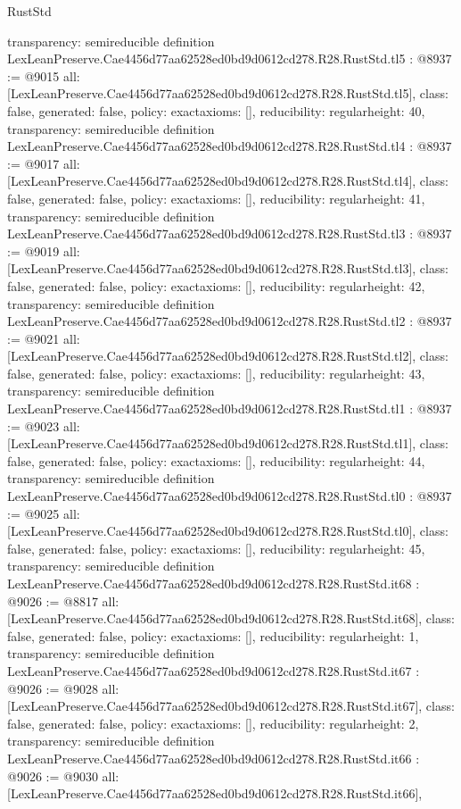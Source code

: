 \begin{lexlean}{RustStd}
\begin{coremodule}
{  transparency: semireducible
}
definition LexLeanPreserve.Cae4456d77aa62528ed0bd9d0612cd278.R28.RustStd.tl5 : @8937 := @9015 {
  all: [LexLeanPreserve.Cae4456d77aa62528ed0bd9d0612cd278.R28.RustStd.tl5],
  class: false,
  generated: false,
  policy: exact{axioms: []},
  reducibility: regular{height: 40},
  transparency: semireducible
}
definition LexLeanPreserve.Cae4456d77aa62528ed0bd9d0612cd278.R28.RustStd.tl4 : @8937 := @9017 {
  all: [LexLeanPreserve.Cae4456d77aa62528ed0bd9d0612cd278.R28.RustStd.tl4],
  class: false,
  generated: false,
  policy: exact{axioms: []},
  reducibility: regular{height: 41},
  transparency: semireducible
}
definition LexLeanPreserve.Cae4456d77aa62528ed0bd9d0612cd278.R28.RustStd.tl3 : @8937 := @9019 {
  all: [LexLeanPreserve.Cae4456d77aa62528ed0bd9d0612cd278.R28.RustStd.tl3],
  class: false,
  generated: false,
  policy: exact{axioms: []},
  reducibility: regular{height: 42},
  transparency: semireducible
}
definition LexLeanPreserve.Cae4456d77aa62528ed0bd9d0612cd278.R28.RustStd.tl2 : @8937 := @9021 {
  all: [LexLeanPreserve.Cae4456d77aa62528ed0bd9d0612cd278.R28.RustStd.tl2],
  class: false,
  generated: false,
  policy: exact{axioms: []},
  reducibility: regular{height: 43},
  transparency: semireducible
}
definition LexLeanPreserve.Cae4456d77aa62528ed0bd9d0612cd278.R28.RustStd.tl1 : @8937 := @9023 {
  all: [LexLeanPreserve.Cae4456d77aa62528ed0bd9d0612cd278.R28.RustStd.tl1],
  class: false,
  generated: false,
  policy: exact{axioms: []},
  reducibility: regular{height: 44},
  transparency: semireducible
}
definition LexLeanPreserve.Cae4456d77aa62528ed0bd9d0612cd278.R28.RustStd.tl0 : @8937 := @9025 {
  all: [LexLeanPreserve.Cae4456d77aa62528ed0bd9d0612cd278.R28.RustStd.tl0],
  class: false,
  generated: false,
  policy: exact{axioms: []},
  reducibility: regular{height: 45},
  transparency: semireducible
}
definition LexLeanPreserve.Cae4456d77aa62528ed0bd9d0612cd278.R28.RustStd.it68 : @9026 := @8817 {
  all: [LexLeanPreserve.Cae4456d77aa62528ed0bd9d0612cd278.R28.RustStd.it68],
  class: false,
  generated: false,
  policy: exact{axioms: []},
  reducibility: regular{height: 1},
  transparency: semireducible
}
definition LexLeanPreserve.Cae4456d77aa62528ed0bd9d0612cd278.R28.RustStd.it67 : @9026 := @9028 {
  all: [LexLeanPreserve.Cae4456d77aa62528ed0bd9d0612cd278.R28.RustStd.it67],
  class: false,
  generated: false,
  policy: exact{axioms: []},
  reducibility: regular{height: 2},
  transparency: semireducible
}
definition LexLeanPreserve.Cae4456d77aa62528ed0bd9d0612cd278.R28.RustStd.it66 : @9026 := @9030 {
  all: [LexLeanPreserve.Cae4456d77aa62528ed0bd9d0612cd278.R28.RustStd.it66],
}
\end{coremodule}
\end{lexlean}
